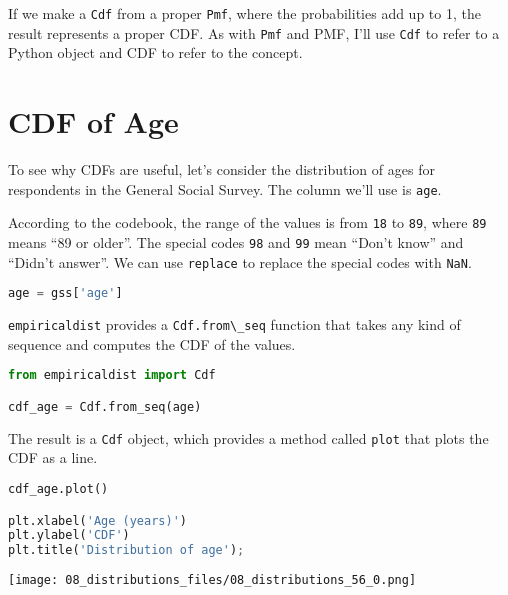 If we make a \passthrough{\lstinline!Cdf!} from a proper
\passthrough{\lstinline!Pmf!}, where the probabilities add up to 1, the
result represents a proper CDF. As with \passthrough{\lstinline!Pmf!}
and PMF, I'll use \passthrough{\lstinline!Cdf!} to refer to a Python
object and CDF to refer to the concept.

\section{CDF of Age}\label{cdf-of-age}

To see why CDFs are useful, let's consider the distribution of ages for
respondents in the General Social Survey. The column we'll use is
\passthrough{\lstinline!age!}.

According to the codebook, the range of the values is from
\passthrough{\lstinline!18!} to \passthrough{\lstinline!89!}, where
\passthrough{\lstinline!89!} means ``89 or older''. The special codes
\passthrough{\lstinline!98!} and \passthrough{\lstinline!99!} mean
``Don't know'' and ``Didn't answer''. We can use
\passthrough{\lstinline!replace!} to replace the special codes with
\passthrough{\lstinline!NaN!}.

\begin{lstlisting}[language=Python,style=source]
age = gss['age']
\end{lstlisting}

\passthrough{\lstinline!empiricaldist!} provides a
\passthrough{\lstinline!Cdf.from\_seq!} function that takes any kind of
sequence and computes the CDF of the values.

\begin{lstlisting}[language=Python,style=source]
from empiricaldist import Cdf

cdf_age = Cdf.from_seq(age)
\end{lstlisting}

The result is a \passthrough{\lstinline!Cdf!} object, which provides a
method called \passthrough{\lstinline!plot!} that plots the CDF as a
line.

\begin{lstlisting}[language=Python,style=source]
cdf_age.plot()

plt.xlabel('Age (years)')
plt.ylabel('CDF')
plt.title('Distribution of age');
\end{lstlisting}

\begin{center}
\texttt{[image: 08\_distributions\_files/08\_distributions\_56\_0.png]}
\end{center}

